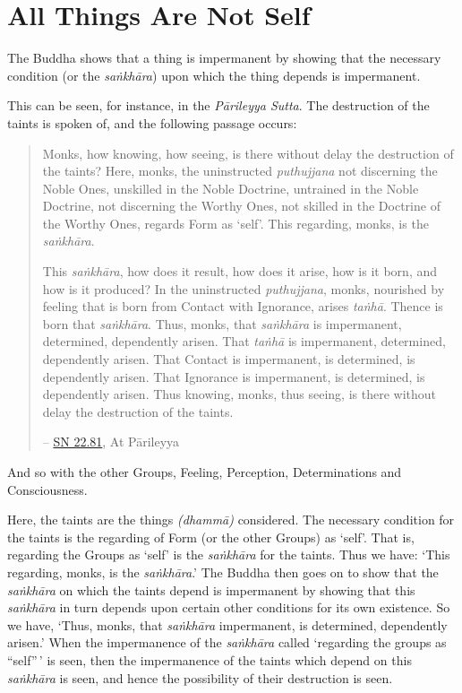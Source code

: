 \chapter{All Things Are Not Self}

The Buddha shows that a thing is impermanent by showing that the necessary condition (or the \emph{saṅkhāra}) upon which the thing depends is impermanent.

This can be seen, for instance, in the \emph{Pārileyya Sutta}. The destruction of the taints is spoken of, and the following passage occurs:

\begin{quote}
Monks, how knowing, how seeing, is there without delay the destruction of the taints? Here, monks, the uninstructed \emph{puthujjana} not discerning the Noble Ones, unskilled in the Noble Doctrine, untrained in the Noble Doctrine, not discerning the Worthy Ones, not skilled in the Doctrine of the Worthy Ones, regards Form as `self'. This regarding, monks, is the \emph{saṅkhāra}.

This \emph{saṅkhāra}, how does it result, how does it arise, how is it born, and how is it produced? In the uninstructed \emph{puthujjana}, monks, nourished by feeling that is born from Contact with Ignorance, arises \emph{taṅhā}. Thence is born that \emph{saṅkhāra}. Thus, monks, that \emph{saṅkhāra} is impermanent, determined, dependently arisen. That \emph{taṅhā} is impermanent, determined, dependently arisen. That Contact is impermanent, is determined, is dependently arisen. That Ignorance is impermanent, is determined, is dependently arisen. Thus knowing, monks, thus seeing, is there without delay the destruction of the taints.

-- \href{https://suttacentral.net/sn22.81/en/bodhi}{SN 22.81}, At Pārileyya
\end{quote}

And so with the other Groups, Feeling, Perception, Determinations and Consciousness.

Here, the taints are the things \emph{(dhammā)} considered. The necessary condition for the taints is the regarding of Form (or the other Groups) as `self'. That is, regarding the Groups as `self' is the \emph{saṅkhāra} for the taints. Thus we have: `This regarding, monks, is the \emph{saṅkhāra}.' The Buddha then goes on to show that the \emph{saṅkhāra} on which the taints depend is impermanent by showing that this \emph{saṅkhāra} in turn depends upon certain other conditions for its own existence. So we have, `Thus, monks, that \emph{saṅkhāra} impermanent, is determined, dependently arisen.' When the impermanence of the \emph{saṅkhāra} called `regarding the groups as ``self''\,' is seen, then the impermanence of the taints which depend on this \emph{saṅkhāra} is seen, and hence the possibility of their destruction is seen.

